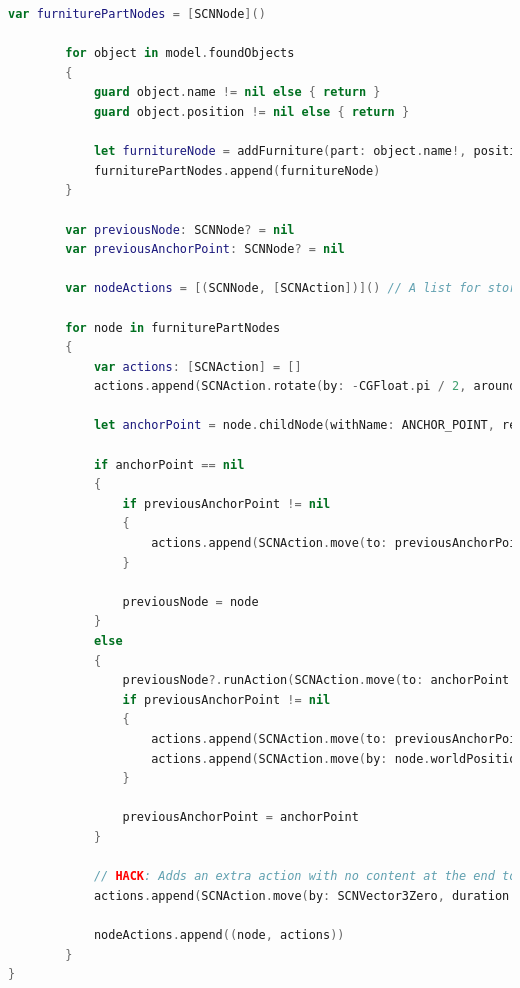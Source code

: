 \begin{lstlisting}[language=swift]
    var furniturePartNodes = [SCNNode]()

        for object in model.foundObjects
        {
            guard object.name != nil else { return }
            guard object.position != nil else { return }
            
            let furnitureNode = addFurniture(part: object.name!, position: object.position!)
            furniturePartNodes.append(furnitureNode)
        }
        
        var previousNode: SCNNode? = nil
        var previousAnchorPoint: SCNNode? = nil
        
        var nodeActions = [(SCNNode, [SCNAction])]() // A list for storing animations to run on a node later
        
        for node in furniturePartNodes
        {
            var actions: [SCNAction] = []
            actions.append(SCNAction.rotate(by: -CGFloat.pi / 2, around: SCNVector3(0, 0, 1), duration: 1))

            let anchorPoint = node.childNode(withName: ANCHOR_POINT, recursively: true)
            
            if anchorPoint == nil
            {
                if previousAnchorPoint != nil
                {
                    actions.append(SCNAction.move(to: previousAnchorPoint!.worldPosition, duration: 2))
                }

                previousNode = node
            }
            else
            {
                previousNode?.runAction(SCNAction.move(to: anchorPoint!.worldPosition, duration: 2))
                if previousAnchorPoint != nil
                {
                    actions.append(SCNAction.move(to: previousAnchorPoint!.worldPosition, duration: 2))
                    actions.append(SCNAction.move(by: node.worldPosition.substract(other: anchorPoint!.worldPosition), duration: 2))
                }

                previousAnchorPoint = anchorPoint
            }
            
            // HACK: Adds an extra action with no content at the end to make completion handler wait until the last action is done
            actions.append(SCNAction.move(by: SCNVector3Zero, duration: 1))
            
            nodeActions.append((node, actions))
        }
}
\end{lstlisting}

